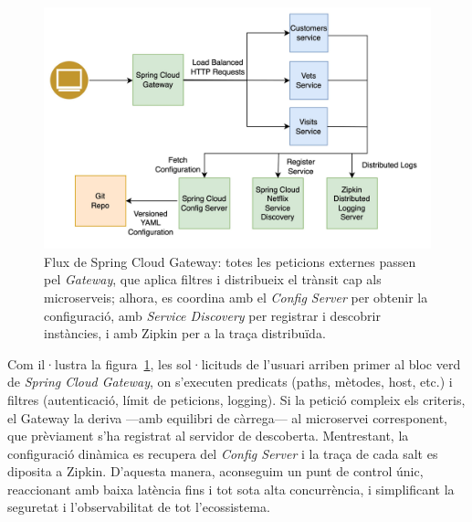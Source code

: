 \begin{figure}[H]
  \centering
  \includegraphics[width=\linewidth]{Figures/MIGMOD-174-SpringCloudServicesArchitetcure.jpg}
  \caption{Flux de Spring Cloud Gateway: totes les peticions externes passen pel \emph{Gateway}, que aplica filtres i distribueix el trànsit cap als microserveis; alhora, es coordina amb el \emph{Config Server} per obtenir la configuració, amb \emph{Service Discovery} per registrar i descobrir instàncies, i amb Zipkin per a la traça distribuïda.}
  \label{fig:gateway-flow}
\end{figure}

Com il·lustra la figura~\ref{fig:gateway-flow}, les sol·licituds de l'usuari arriben primer al bloc verd de \emph{Spring Cloud Gateway}, on s'executen predicats (paths, mètodes, host, etc.) i filtres (autenticació, límit de peticions, logging).  
Si la petició compleix els criteris, el Gateway la deriva —amb equilibri de càrrega— al microservei corresponent, que prèviament s'ha registrat al servidor de descoberta.  
Mentrestant, la configuració dinàmica es recupera del \emph{Config Server} i la traça de cada salt es diposita a Zipkin.  
D'aquesta manera, aconseguim un punt de control únic, reaccionant amb baixa latència fins i tot sota alta concurrència, i simplificant la seguretat i l'observabilitat de tot l'ecossistema.

